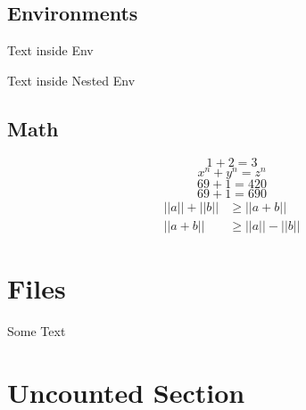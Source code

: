 \subsection{Environments}
\begin{Some_Env}
Text inside Env

\begin{Nested_Env}
Text inside Nested Env

\end{Nested_Env}
\end{Some_Env}
\subsection{Math}
\label{math}
$$1+2 = 3$$
\[x^n + y^n = z^n\]
\begin{displaymath}
69 + 1 = 420
\end{displaymath}
\begin{equation}
69 + 1 = 690
\end{equation}
\begin{align}
||a|| + ||b|| &\geq ||a+b|| \\
||a+b|| &\geq ||a|| - ||b||
\end{align}
\section{Files}
Some Text



\section*{Uncounted Section}

